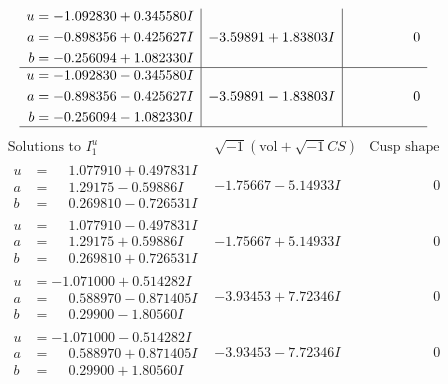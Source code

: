 \documentclass[1p]{elsarticle_modified}
\theoremstyle{definition}
\newcommand{\I}{\sqrt{-1}}
\begin{document}
$$\begin{array}{c|c|c}
\begin{aligned}
u &= -1.092830 + 0.345580 I \\
a &= -0.898356 + 0.425627 I \\
b &= -0.256094 + 1.082330 I\end{aligned}
 & -3.59891 + 1.83803 I & \phantom{-0.000000 } 0 \\ \hline\begin{aligned}
u &= -1.092830 - 0.345580 I \\
a &= -0.898356 - 0.425627 I \\
b &= -0.256094 - 1.082330 I\end{aligned}
 & -3.59891 - 1.83803 I & \phantom{-0.000000 } 0\\
 \hline 
 \end{array}$$\newpage$$\begin{array}{c|c|c}  
\text{Solutions to }I^u_{1}& \I (\text{vol} + \sqrt{-1}CS) & \text{Cusp shape}\\
 \hline 
\begin{aligned}
u &= \phantom{-}1.077910 + 0.497831 I \\
a &= \phantom{-}1.29175 - 0.59886 I \\
b &= \phantom{-}0.269810 - 0.726531 I\end{aligned}
 & -1.75667 - 5.14933 I & \phantom{-0.000000 } 0 \\ \hline\begin{aligned}
u &= \phantom{-}1.077910 - 0.497831 I \\
a &= \phantom{-}1.29175 + 0.59886 I \\
b &= \phantom{-}0.269810 + 0.726531 I\end{aligned}
 & -1.75667 + 5.14933 I & \phantom{-0.000000 } 0 \\ \hline\begin{aligned}
u &= -1.071000 + 0.514282 I \\
a &= \phantom{-}0.588970 - 0.871405 I \\
b &= \phantom{-}0.29900 - 1.80560 I\end{aligned}
 & -3.93453 + 7.72346 I & \phantom{-0.000000 } 0 \\ \hline\begin{aligned}
u &= -1.071000 - 0.514282 I \\
a &= \phantom{-}0.588970 + 0.871405 I \\
b &= \phantom{-}0.29900 + 1.80560 I\end{aligned}
 & -3.93453 - 7.72346 I & \phantom{-0.000000 } 0 \\ \hline\begin{aligned}

\end{aligned}
\end{array}$$
\end{document}
